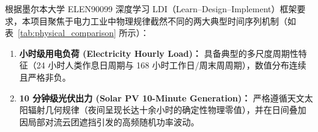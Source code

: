 \documentclass[11pt,a4paper,UTF8]{ctexart}
\begin{document}
根据墨尔本大学 ELEN90099 深度学习 LDI（Learn--Design--Implement）框架要求，本项目聚焦于电力工业中物理规律截然不同的两大典型时间序列机制（如表~\ref{tab:physical_comparison} 所示）：
\begin{enumerate}
    \item \textbf{小时级用电负荷 (Electricity Hourly Load)：} 具备典型的多尺度周期性特征（24 小时人类作息日周期与 168 小时工作日/周末周周期），数值分布连续且严格非负。
    \item \textbf{10 分钟级光伏出力 (Solar PV 10-Minute Generation)：} 严格遵循天文太阳辐射几何规律（夜间呈现长达十余小时的确定性物理零值），并在日间叠加因局部对流云团遮挡引发的高频随机功率波动。
\end{enumerate}

\begin{table}[H]
\centering
\small
\caption{用电负荷与光伏出力两大工业时序机制物理特性对比表}
\label{tab:physical_comparison}
\end{table}
\end{document}
